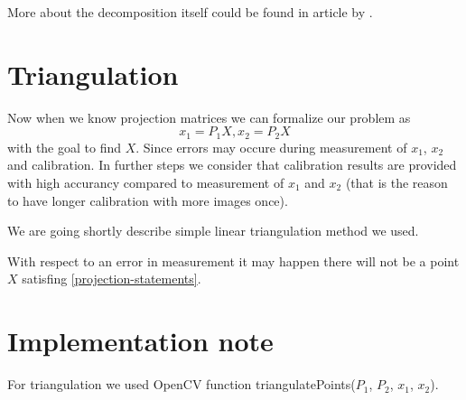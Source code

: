 More about the decomposition itself could be found in article by \citet{computervisionblog}.

\section{Triangulation}
Now when we know projection matrices we can formalize our problem as 
\begin{equation}
x_1 = P_1X, x_2 = P_2X \label{projection-statements}
\end{equation}
with the goal to find $X$. Since errors may occure during
measurement of $x_1$, $x_2$ and calibration. In further steps we consider that
calibration results are provided with high accurancy compared to measurement of
$x_1$ and $x_2$ (that is the reason to have longer calibration with more images
once).

We are going shortly describe simple linear triangulation method we used. 

With respect to an error in measurement it may happen there will not be a point
$X$ satisfing \ref{projection-statements}.





\section{Implementation note}
For triangulation we used OpenCV function triangulatePoints($P_1$, $P_2$, $x_1$, $x_2$).
